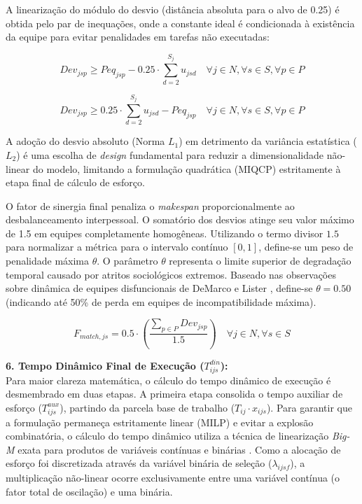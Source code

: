 \documentclass[a4paper,11pt]{article}
\begin{document}
A linearização do módulo do desvio (distância absoluta para o alvo de 0.25) é obtida pelo par de inequações, onde a constante ideal é condicionada à existência da equipe para evitar penalidades em tarefas não executadas:

\begin{equation}
    Dev_{jsp} \ge Peq_{jsp} - 0.25 \cdot \sum_{d=2}^{S_j} u_{jsd} \quad \forall j \in N, \forall s \in S, \forall p \in P
\end{equation}

\begin{equation}
    Dev_{jsp} \ge 0.25 \cdot \sum_{d=2}^{S_j} u_{jsd} - Peq_{jsp} \quad \forall j \in N, \forall s \in S, \forall p \in P
\end{equation}

A adoção do desvio absoluto (Norma $L_1$) em detrimento da variância estatística ($L_2$) é uma escolha de \textit{design} fundamental para reduzir a dimensionalidade não-linear do modelo, limitando a formulação quadrática (MIQCP) estritamente à etapa final de cálculo de esforço.

O fator de sinergia final penaliza o \textit{makespan} proporcionalmente ao desbalanceamento interpessoal. O somatório dos desvios atinge seu valor máximo de 1.5 em equipes completamente homogêneas. Utilizando o termo divisor $1.5$ para normalizar a métrica para o intervalo contínuo $[0, 1]$, define-se um peso de penalidade máxima $\theta$. O parâmetro $\theta$ representa o limite superior de degradação temporal causado por atritos sociológicos extremos. Baseado nas observações sobre dinâmica de equipes disfuncionais de DeMarco e Lister \citep{demarco1987}, define-se $\theta = 0.50$ (indicando até 50\% de perda em equipes de incompatibilidade máxima).

\begin{equation}
    F_{match, js} = 0.5 \cdot \left( \frac{\sum_{p \in P} Dev_{jsp}}{1.5} \right) \quad \forall j \in N, \forall s \in S
\end{equation}

\vspace{0.2cm}
\noindent\textbf{6. Tempo Dinâmico Final de Execução ($T^{din}_{ijs}$):} \\

Para maior clareza matemática, o cálculo do tempo dinâmico de execução é desmembrado em duas etapas. A primeira etapa consolida o tempo auxiliar de esforço ($T^{aux}_{ijs}$), partindo da parcela base de trabalho ($T_{ij} \cdot x_{ijs}$).
Para garantir que a formulação permaneça estritamente linear (MILP) e evitar a explosão combinatória, o cálculo do tempo dinâmico utiliza a técnica de linearização \textit{Big-M} exata para produtos de variáveis contínuas e binárias \citep{glover1975}. Como a alocação de esforço foi discretizada através da variável binária de seleção ($\lambda_{ijsf}$), a multiplicação não-linear ocorre exclusivamente entre uma variável contínua (o fator total de oscilação) e uma binária.
\end{document}

